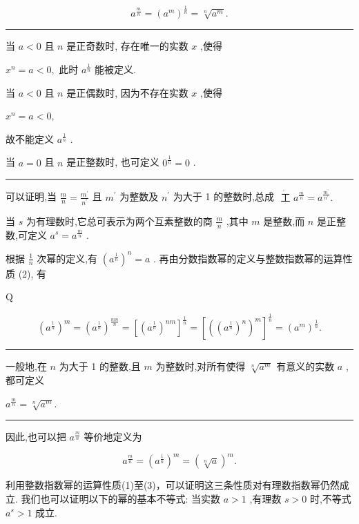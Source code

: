 \documentclass[10pt]{article}
\newcommand{\HRule}{\begin{center}\rule{0.9\linewidth}{0.2mm}\end{center}}
\begin{document}
\[
{a}^{\frac{m}{n}} = {\left( {a}^{m}\right) }^{\frac{1}{n}} = \sqrt[n]{{a}^{m}}.
\]

\HRule

当 \(a < 0\) 且 \(n\) 是正奇数时, 存在唯一的实数 \(x\) ,使得

\({x}^{n} = a < 0,\) 此时 \({a}^{\frac{1}{n}}\) 能被定义.

当 \(a < 0\) 且 \(n\) 是正偶数时, 因为不存在实数 \(x\) ,使得

\({x}^{n} = a < 0,\)

故不能定义 \({a}^{\frac{1}{n}}\) .

当 \(a = 0\) 且 \(n\) 是正整数时, 也可定义 \({0}^{\frac{1}{n}} = 0\) .

\HRule

可以证明,当 \(\frac{m}{n} = \frac{{m}^{\prime }}{{n}^{\prime }}\) 且 \({m}^{\prime }\) 为整数及 \({n}^{\prime }\) 为大于 1 的整数时,总成 \(\dot{\text{ 工 }}{a}^{\frac{m}{n}} = {a}^{\frac{{m}^{\prime }}{{n}^{\prime }}}.\)

当 \(s\) 为有理数时,它总可表示为两个互素整数的商 \(\frac{m}{n}\) ,其中 \(m\) 是整数,而 \(n\) 是正整数,可定义 \({a}^{s} = {a}^{\frac{m}{n}}\) .

根据 \(\frac{1}{n}\) 次幂的定义,有 \({\left( {a}^{\frac{1}{n}}\right) }^{n} = a\) . 再由分数指数幂的定义与整数指数幂的运算性质 (2), 有

Q

\[
{\left( {a}^{\frac{1}{n}}\right) }^{m} = {\left( {a}^{\frac{1}{n}}\right) }^{\frac{nm}{n}} = {\left\lbrack  {\left( {a}^{\frac{1}{n}}\right) }^{nm}\right\rbrack  }^{\frac{1}{n}} = {\left\lbrack  {\left( {\left( {a}^{\frac{1}{n}}\right) }^{n}\right) }^{m}\right\rbrack  }^{\frac{1}{n}} = {\left( {a}^{m}\right) }^{\frac{1}{n}}.
\]

\HRule

一般地,在 \(n\) 为大于 1 的整数,且 \(m\) 为整数时,对所有使得 \(\sqrt[n]{{a}^{m}}\) 有意义的实数 \(a\) ,都可定义

\({a}^{\frac{m}{n}} = \sqrt[n]{{a}^{m}}.\)

\HRule

因此,也可以把 \({a}^{\frac{m}{n}}\) 等价地定义为

\[
{a}^{\frac{m}{n}} = {\left( {a}^{\frac{1}{n}}\right) }^{m} = {\left( \sqrt[n]{a}\right) }^{m}.
\]

利用整数指数幂的运算性质(1)至(3)，可以证明这三条性质对有理数指数幂仍然成立. 我们也可以证明以下的幂的基本不等式: 当实数 \(a > 1\) ,有理数 \(s > 0\) 时,不等式 \({a}^{s} > 1\) 成立.
\end{document}

